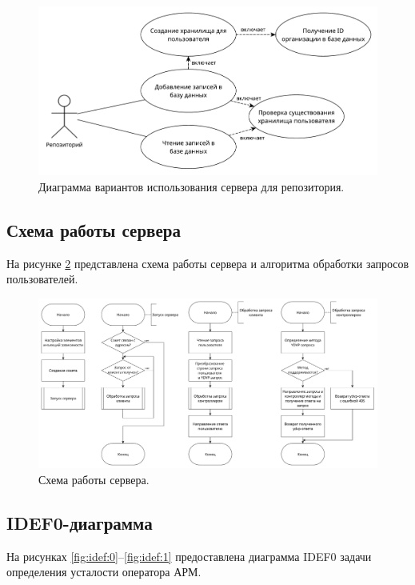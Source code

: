 \begin{figure}[H]
	\centering
	\includegraphics[width=\textwidth]{img/useCaseServer.pdf}
	\caption{Диаграмма вариантов использования сервера для репозитория.}
	\label{fig:serverUseCase}
\end{figure}

\subsection{Схема работы сервера}

На рисунке \ref{fig:serverWork} представлена схема работы сервера и алгоритма обработки запросов пользователей.

\begin{figure}[H]
	\centering
	\includegraphics[width=\textwidth]{img/serverWorkScheme.pdf}
	\caption{Схема работы сервера.}
	\label{fig:serverWork}
\end{figure}

\subsection{IDEF0-диаграмма}
На рисунках \ref{fig:idef:0}--\ref{fig:idef:1} предоставлена диаграмма IDEF0 задачи определения усталости оператора АРМ.

